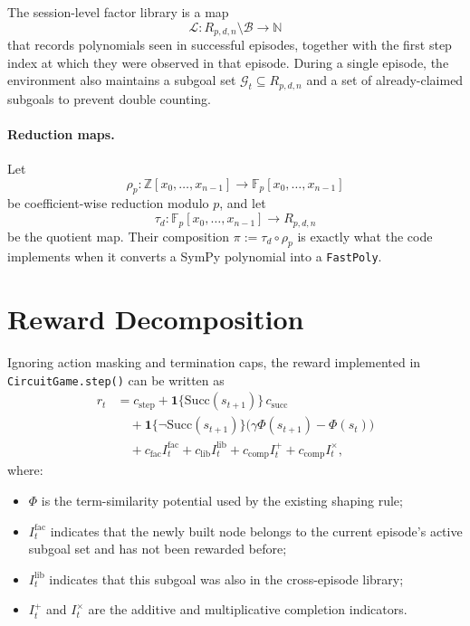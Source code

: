 \documentclass[11pt]{article}
\theoremstyle{remark}
\newcommand{\Fp}{\mathbb{F}_p}
\newcommand{\Z}{\mathbb{Z}}
\newcommand{\B}{\mathcal{B}}
\newcommand{\Llib}{\mathcal{L}}
\newcommand{\Gset}{\mathcal{G}}
\begin{document}
The session-level factor library is a map
\[
\Llib : R_{p,d,n} \setminus \B \to \mathbb{N}
\]
that records polynomials seen in successful episodes, together with the first
step index at which they were observed in that episode. During a single episode,
the environment also maintains a subgoal set $\Gset_t \subseteq R_{p,d,n}$ and
a set of already-claimed subgoals to prevent double counting.

\paragraph{Reduction maps.}
Let
\[
\rho_p : \Z[x_0,\dots,x_{n-1}] \to \Fp[x_0,\dots,x_{n-1}]
\]
be coefficient-wise reduction modulo $p$, and let
\[
\tau_d : \Fp[x_0,\dots,x_{n-1}] \to R_{p,d,n}
\]
be the quotient map. Their composition $\pi := \tau_d \circ \rho_p$ is exactly
what the code implements when it converts a SymPy polynomial into a
\texttt{FastPoly}.

\section{Reward Decomposition}

Ignoring action masking and termination caps, the reward implemented in
\texttt{CircuitGame.step()} can be written as
\begin{align*}
r_t
&=
c_{\mathrm{step}}
+ \mathbf{1}\{\mathrm{Succ}(s_{t+1})\} \, c_{\mathrm{succ}} \\
&\quad
+ \mathbf{1}\{\neg \mathrm{Succ}(s_{t+1})\}
\bigl(\gamma \Phi(s_{t+1}) - \Phi(s_t)\bigr) \\
&\quad
+ c_{\mathrm{fac}} I^{\mathrm{fac}}_t
+ c_{\mathrm{lib}} I^{\mathrm{lib}}_t
+ c_{\mathrm{comp}} I^{+}_t
+ c_{\mathrm{comp}} I^{\times}_t,
\end{align*}
where:
\begin{itemize}[leftmargin=2em]
\item $\Phi$ is the term-similarity potential used by the existing shaping rule;
\item $I^{\mathrm{fac}}_t$ indicates that the newly built node belongs to the
current episode's active subgoal set and has not been rewarded before;
\item $I^{\mathrm{lib}}_t$ indicates that this subgoal was also in the
cross-episode library;
\item $I_t^+$ and $I_t^\times$ are the additive and multiplicative completion
indicators.
\end{itemize}
\end{document}
